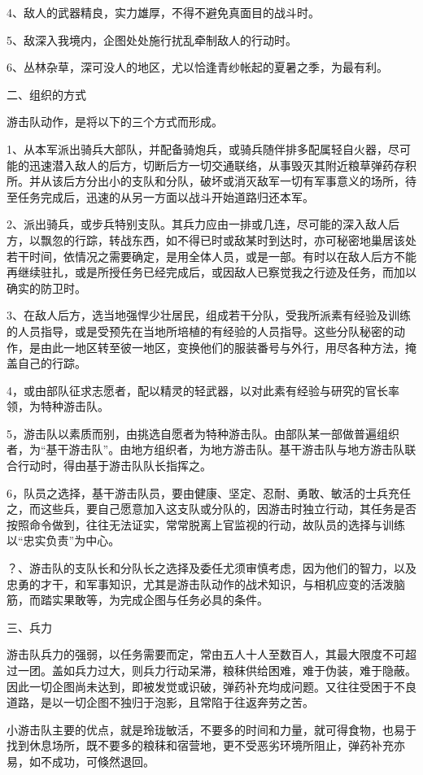4、敌人的武器精良，实力雄厚，不得不避免真面目的战斗时。

5、敌深入我境内，企图处处施行扰乱牵制敌人的行动时。

6、丛林杂草，深可没人的地区，尤以恰逢青纱帐起的夏暑之季，为最有利。

二、组织的方式

游击队动作，是将以下的三个方式而形成。

1、从本军派出骑兵大部队，并配备骑炮兵，或骑兵随伴排多配属轻自火器，尽可能的迅速潜入敌人的后方，切断后方一切交通联络，从事毁灭其附近粮草弹药存积所。并从该后方分出小的支队和分队，破坏或消灭敌军一切有军事意义的场所，待至任务完成后，迅速的从另一方面以战斗开始道路归还本军。

2、派出骑兵，或步兵特别支队。其兵力应由一排或几连，尽可能的深入敌人后方，以飘忽的行踪，转战东西，如不得已时或敌某时到达时，亦可秘密地巢居该处若干时间，依情况之需要确定，是用全体人员，或是一部。有时以在敌人后方不能再继续驻扎，或是所授任务已经完成后，或因敌人已察觉我之行迹及任务，而加以确实的防卫时。

3、在敌人后方，选当地强悍少壮居民，组成若干分队，受我所派素有经验及训练的人员指导，或是受预先在当地所培植的有经验的人员指导。这些分队秘密的动作，是由此一地区转至彼一地区，变换他们的服装番号与外行，用尽各种方法，掩盖自己的行踪。

4，或由部队征求志愿者，配以精灵的轻武器，以对此素有经验与研究的官长率领，为特种游击队。

5，游击队以素质而别，由挑选自愿者为特种游击队。由部队某一部做普遍组织者，为“基干游击队”。由地方组织者，为地方游击队。基干游击队与地方游击队联合行动时，得由基于游击队队长指挥之。

6，队员之选择，基干游击队员，要由健康、坚定、忍耐、勇敢、敏活的士兵充任之，而这些兵，要自己愿意加入这支队或分队的，因游击时独立行动，其任务是否按照命令做到，往往无法证实，常常脱离上官监视的行动，故队员的选择与训练以“忠实负责”为中心。

？、游击队的支队长和分队长之选择及委任尤须审慎考虑，因为他们的智力，以及忠勇的才干，和军事知识，尤其是游击队动作的战术知识，与相机应变的活泼脑筋，而踏实果敢等，为完成企图与任务必具的条件。

三、兵力

游击队兵力的强弱，以任务需要而定，常由五人十人至数百人，其最大限度不可超过一团。盖如兵力过大，则兵力行动呆滞，粮秣供给困难，难于伪装，难于隐蔽。因此一切企图尚未达到，即被发觉或识破，弹药补充均成问题。又往往受困于不良道路，是以一切企图不独归于泡影，且常陷于往返奔劳之苦。

小游击队主要的优点，就是玲珑敏活，不要多的时间和力量，就可得食物，也易于找到休息场所，既不要多的粮秣和宿营地，更不受恶劣环境所阻止，弹药补充亦易，如不成功，可倏然退回。

